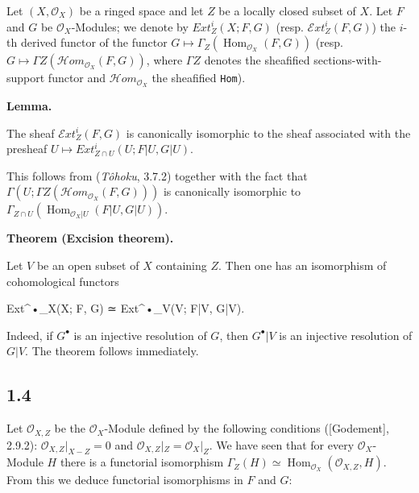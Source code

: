 \documentclass[
  11pt,
  a4paper,
]{book}
\newenvironment{Shaded}{}{}
\newcommand{\NormalTok}[1]{#1}
\begin{document}
Let \((X, \mathcal{O}_{X})\) be a ringed space and let \(Z\) be a
locally closed subset of \(X\). Let \(F\) and \(G\) be
\(\mathcal{O}_{X}\)-Modules; we denote by \(Ext^{i}_{Z}(X; F, G)\)
(resp. \(\mathcal{E}xt^{i}_{Z}(F, G)\)) the \(i\)-th derived functor of
the functor
\(G \mapsto \Gamma_{Z}(\operatorname{Hom}_{\mathcal{O}_{X}}(F, G))\)
(resp. \(G \mapsto \Gamma
Z(\mathcal{H}om_{\mathcal{O}_{X}}(F, G))\), where \(\Gamma Z\) denotes
the sheafified sections-with-support functor and
\(\mathcal{H}om_{\mathcal{O}_{X}}\) the sheafified \texttt{Hom}).

\textbf{Lemma.}

The sheaf \(\mathcal{E}xt^{i}_{Z}(F, G)\) is canonically isomorphic to
the sheaf associated with the presheaf \(U \mapsto
Ext^{i}_{Z \cap U}(U; F|U, G|U)\).

This follows from (\emph{Tôhoku}, 3.7.2) together with the fact that
\(\Gamma(U; \Gamma Z(\mathcal{H}om_{\mathcal{O}_{X}}(F,
G)))\) is canonically isomorphic to
\(\Gamma_{Z \cap U}(\operatorname{Hom}_{\mathcal{O}_{X}|U}(F|U, G|U))\).

\textbf{Theorem (Excision theorem).}

Let \(V\) be an open subset of \(X\) containing \(Z\). Then one has an
isomorphism of cohomological functors

\begin{Shaded}
\begin{Highlighting}[]
\NormalTok{Ext\^{}•\_X(X; F, G) ≃ Ext\^{}•\_V(V; F|V, G|V).}
\end{Highlighting}
\end{Shaded}

Indeed, if \(G^{\bullet}\) is an injective resolution of \(G\), then
\(G^{\bullet}|V\) is an injective resolution of \(G|V\). The theorem
follows immediately.

\subsection{1.4}\label{section-1}

Let \(\mathcal{O}_{X,Z}\) be the \(\mathcal{O}_{X}\)-Module defined by
the following conditions ({[}Godement{]}, 2.9.2):
\(\mathcal{O}_{X,Z}|_{X - Z} = 0\) and
\(\mathcal{O}_{X,Z}|_{Z} = \mathcal{O}_{X}|_{Z}\). We have seen that for
every \(\mathcal{O}_{X}\)-Module \(H\) there is a functorial isomorphism
\(\Gamma_{Z}(H) \simeq
\operatorname{Hom}_{\mathcal{O}_{X}}(\mathcal{O}_{X,Z}, H)\). From this
we deduce functorial isomorphisms in \(F\) and \(G\):
\end{document}
